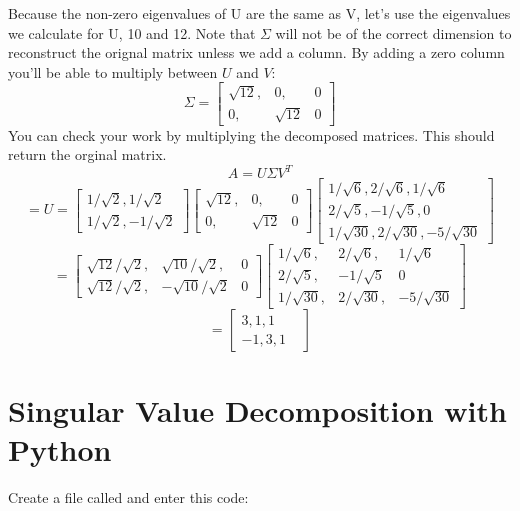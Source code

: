 Because the non-zero eigenvalues of U are the same as V, let's use the eigenvalues we calculate for U, 10 and 12. Note that $\Sigma$ will not be of the correct dimension to reconstruct the orignal matrix unless we add a column. By adding a zero column you'll be able to multiply between $U$ and $V$:
$$
\Sigma = 
\begin{bmatrix}
\sqrt{12}, &0,&0\\
 0,&\sqrt{12}  &0 
\end{bmatrix}
$$
You can check your work by multiplying the decomposed matrices. This should return the orginal matrix.
$$A = U\Sigma V^T $$
$$ = 
U = \begin{bmatrix}
1/\sqrt{2},1/\sqrt{2} \\
1/\sqrt{2},-1/\sqrt{2} 
\end{bmatrix}
\begin{bmatrix}
\sqrt{12}, &0,&0\\
 0,&\sqrt{12}  &0 
\end{bmatrix}
\begin{bmatrix}
1/\sqrt{6},2/\sqrt{6},1/\sqrt{6} \\
2/\sqrt{5},-1/\sqrt{5},0\\
1/\sqrt{30},2/\sqrt{30},-5/\sqrt{30}
\end{bmatrix}
$$
$$=
\begin{bmatrix}
\sqrt{12}/\sqrt{2}, &\sqrt{10}/\sqrt{2},&0\\
\sqrt{12}/\sqrt{2},&-\sqrt{10}/\sqrt{2} &0 
\end{bmatrix}
\begin{bmatrix}
1/\sqrt{6}, &2/\sqrt{6},&1/\sqrt{6}\\
2/\sqrt{5},&-1/\sqrt{5} &0 \\
1/\sqrt{30},&2/\sqrt{30},&-5/\sqrt{30}
\end{bmatrix}
$$
$$
=
\begin{bmatrix}
3,1,1 &  \\
 -1, 3,1& 
\end{bmatrix}
$$ 

\section{Singular Value Decomposition with Python}
Create a file called  and enter this code:


